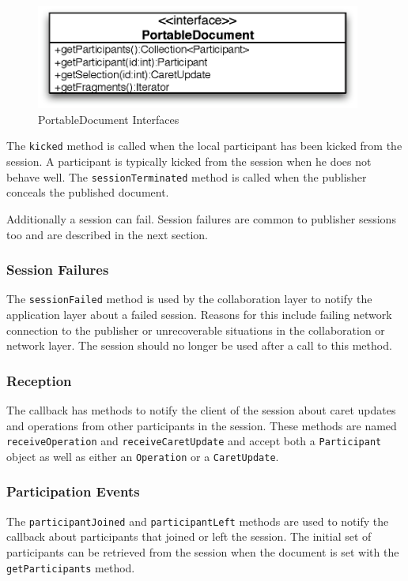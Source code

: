 \begin{figure}[H]
 \centering
 \includegraphics[width=10.69cm,height=3.42cm]{../images/finalreport/architecture_portabledocument_uml.eps}
 \caption{PortableDocument Interfaces}
\end{figure}

The \texttt{kicked} method is called when the local participant
has been kicked from the session. A participant is typically kicked from
the session when he does not behave well. The \texttt{sessionTerminated}
method is called when the publisher conceals the published document. 

Additionally a session can fail. Session failures are common to publisher
sessions too and are described in the next section.


\subsubsection{Session Failures}
\label{sect:archoverview.sessionfailure}
The \texttt{sessionFailed}
method is used by the collaboration layer to notify the application layer
about a failed session. Reasons for this include failing network connection
to the publisher or unrecoverable situations in the collaboration or network
layer. The session should no longer be used after a call to 
this method.


\subsubsection{Reception}
The callback has methods to notify the client of the session about caret
updates and operations from other participants in the session. These methods
are named \texttt{receiveOperation} and \texttt{receiveCaretUpdate}
and accept both a \texttt{Participant} object
as well as either an \texttt{Operation} or a \texttt{CaretUpdate}.


\subsubsection{Participation Events}
The \texttt{participantJoined} and \texttt{participantLeft} methods are used to
notify the callback about
participants that joined or left the session. The initial set of participants
can be retrieved from the session when the document is set with
the \texttt{getParticipants} method.


